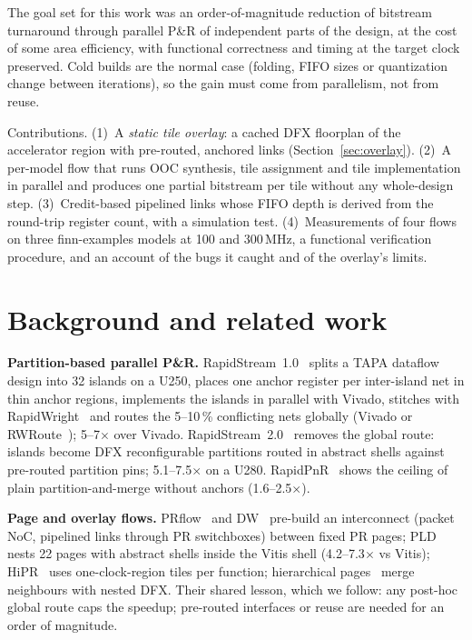 \documentclass[10pt,twocolumn]{article}
\begin{document}
The goal set for this work was an order-of-magnitude reduction of bitstream turnaround through
parallel P\&R of independent parts of the design, at the cost of some area efficiency, with
functional correctness and timing at the target clock preserved. Cold builds are the normal case
(folding, FIFO sizes or quantization change between iterations), so the gain must come from
parallelism, not from reuse.

Contributions. (1)~A \emph{static tile overlay}: a cached DFX floorplan of the accelerator
region with pre-routed, anchored links (Section~\ref{sec:overlay}). (2)~A per-model flow that
runs OOC synthesis, tile assignment and tile implementation in parallel and produces one partial
bitstream per tile without any whole-design step. (3)~Credit-based pipelined links whose FIFO
depth is derived from the round-trip register count, with a simulation test. (4)~Measurements
of four flows on three finn-examples models at 100 and 300\,MHz, a functional verification
procedure, and an account of the bugs it caught and of the overlay's limits.

\section{Background and related work}
\textbf{Partition-based parallel P\&R.} RapidStream~1.0~\cite{rs1} splits a TAPA dataflow design
into 32 islands on a U250, places one anchor register per inter-island net in thin anchor
regions, implements the islands in parallel with Vivado, stitches with
RapidWright~\cite{rapidwright} and routes the 5--10\,\% conflicting nets globally (Vivado or
RWRoute~\cite{rwroute}); 5--7$\times$ over Vivado. RapidStream~2.0~\cite{rs2} removes the global
route: islands become DFX reconfigurable partitions routed in abstract shells against pre-routed
partition pins; 5.1--7.5$\times$ on a U280. RapidPnR~\cite{rapidpnr} shows the ceiling of plain
partition-and-merge without anchors (1.6--2.5$\times$).

\textbf{Page and overlay flows.} PRflow~\cite{prflow} and DW~\cite{dw} pre-build an interconnect
(packet NoC, pipelined links through PR switchboxes) between fixed PR pages; PLD~\cite{pld} nests
22 pages with abstract shells inside the Vitis shell (4.2--7.3$\times$ vs Vitis);
HiPR~\cite{hipr} uses one-clock-region tiles per function; hierarchical pages~\cite{hpages}
merge neighbours with nested DFX. Their shared lesson, which we follow: any post-hoc global route
caps the speedup; pre-routed interfaces or reuse are needed for an order of magnitude.
\end{document}
